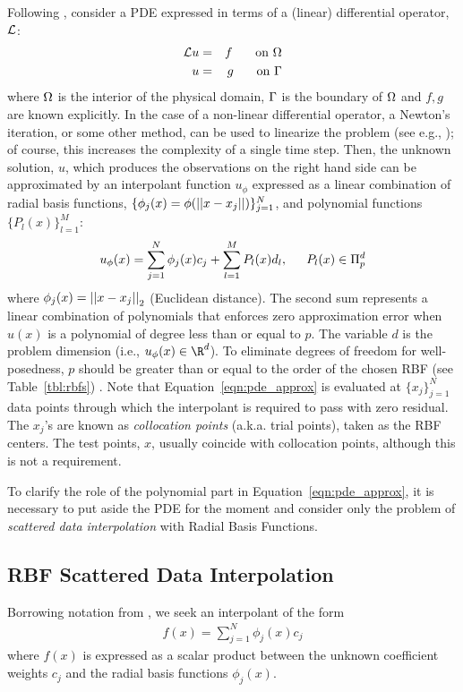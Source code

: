 \documentclass[11pt]{report}
\begin{document}
{Following \cite{Mouat2002}, consider a PDE expressed in terms of a (linear) differential operator, $\diffop$: 
\begin{eqnarray*}
\mathcal{L}u & = & f \hskip1.5em \textrm{ on } \Omega \\
u &=& g \hskip1.5em \textrm{ on } \Gamma
\end{eqnarray*}
where $\Omega$ is the interior of the physical domain, $\Gamma$ is the boundary of $\Omega$ and $f,g$ are known explicitly. In the case of a non-linear differential operator, a Newton's iteration, or some other method, can be used to linearize the problem (see e.g., \cite{WrightFornberg06}); of course, this increases the complexity of a single time step. Then, the unknown solution, $u$, which produces the observations on the right hand side can be approximated by an interpolant function $u_{\phi}$ expressed as a linear combination of radial basis functions, $\{\phi_j(x) = \phi(\left|\left|x-x_j\right|\right|)\}_{j=1}^{N}$, and polynomial functions$\{P_l(x)\}_{l=1}^{M}$:
\begin{equation}
	u_{\phi}(x) = \sum_{j=1}^{N}  \phi_j(x) c_{j} + \sum_{l=1}^{M}  P_l(x) d_{l}, \hskip1.5em P_l(x) \in \Pi^{d}_{p}
	\label{eqn:pde_approx}
\end{equation}
where $\phi_j(x) = \left|\left|x - x_j\right|\right|_2$ (Euclidean distance). The 
second sum represents a linear combination of polynomials that enforces zero approximation error
 when $u(x)$ is a polynomial of degree less than or equal to $p$. The variable $d$ is the 
 problem dimension (i.e., $u_{\phi}(x) \in \R^{d}$). 
To eliminate degrees of freedom for well-posedness, $p$ should be greater than or equal to the order of the chosen RBF
 (see Table~\ref{tbl:rbfs}) \cite{Iske2004}.  
Note that Equation~\ref{eqn:pde_approx} is evaluated 
 at $\{x_j\}_{j=1}^{N}$ 
data points through which the interpolant is required to pass with zero residual.  The $x_j$'s are known as \emph{collocation points} (a.k.a. trial points), taken as the RBF centers. The test points, $x$, usually coincide with collocation points, although this is not a requirement. 

To clarify the role of the polynomial part in Equation~\ref{eqn:pde_approx}, it is necessary to
put aside the PDE for the moment and consider only the problem of \emph{scattered data 
interpolation} with Radial Basis Functions.

\subsection{RBF Scattered Data Interpolation}
 Borrowing notation from \cite{Fasshauer2007, Iske2004}, 
we seek an interpolant of the form
\begin{eqnarray*}
f(x) = \sum_{j=1}^{N} \phi_j(x) c_{j}  \label{eq:rbf_scattered_data_interp}
\end{eqnarray*}
where $f(x)$ is expressed as a scalar product between the unknown coefficient weights $c_j$ and the radial basis functions $\phi_j(x)$.

}
\end{document}
